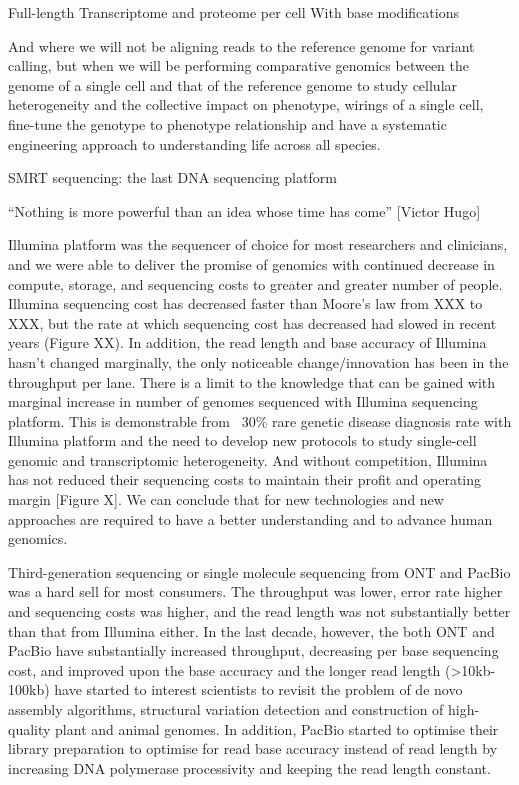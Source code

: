 Full-length
Transcriptome and proteome per cell
With base modifications

And where we will not be aligning reads to the reference genome for variant calling, but when we will be performing comparative genomics between the genome of a single cell and that of the reference genome to study cellular heterogeneity and the collective impact on phenotype, wirings of a single cell, fine-tune the genotype to phenotype relationship and have a systematic engineering approach to understanding life across all species.


SMRT sequencing: the last DNA sequencing platform

“Nothing is more powerful than an idea whose time has come” [Victor Hugo]

Illumina platform was the sequencer of choice for most researchers and clinicians, and we were able to deliver the promise of genomics with continued decrease in compute, storage, and sequencing costs to greater and greater number of people. Illumina sequencing cost has decreased faster than Moore’s law from XXX to XXX, but the rate at which sequencing cost has decreased had slowed in recent years (Figure XX). In addition, the read length and base accuracy of Illumina hasn’t changed marginally, the only noticeable change/innovation has been in the throughput per lane. There is a limit to the knowledge that can be gained with marginal increase in number of genomes sequenced with Illumina sequencing platform. This is demonstrable from ~30\% rare genetic disease diagnosis rate with Illumina platform and the need to develop new protocols to study single-cell genomic and transcriptomic heterogeneity. And without competition, Illumina has not reduced their sequencing costs to maintain their profit and operating margin [Figure X]. We can conclude that for new technologies and new approaches are required to have a better understanding and to advance human genomics. 

Third-generation sequencing or single molecule sequencing from ONT and PacBio was a hard sell for most consumers. The throughput was lower, error rate higher and sequencing costs was higher, and the read length was not substantially better than that from Illumina either. In the last decade, however, the both ONT and PacBio have substantially increased throughput, decreasing per base sequencing cost, and improved upon the base accuracy and the longer read length (>10kb-100kb) have started to interest scientists to revisit the problem of de novo assembly algorithms, structural variation detection and construction of high-quality plant and animal genomes. In addition, PacBio started to optimise their library preparation to optimise for read base accuracy instead of read length by increasing DNA polymerase processivity and keeping the read length constant. 

